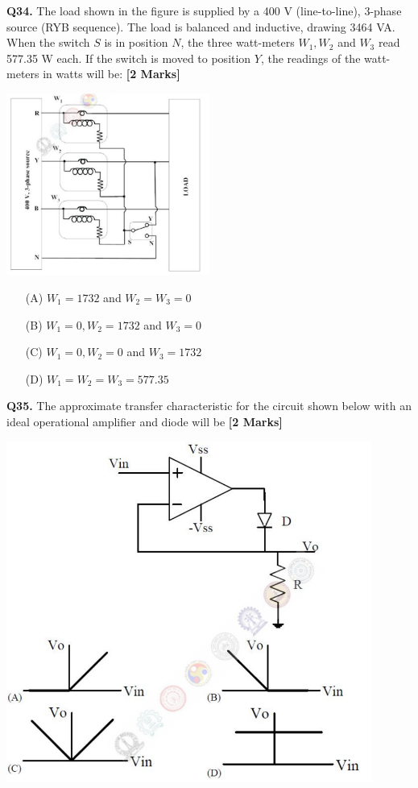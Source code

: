 \documentclass[11pt]{article}
\newcommand{\questionb}[2]{
    \noindent\textbf{Q#2.} #1 \hfill \textbf{[2 Marks]}
}
\begin{document}
\questionb{The load shown in the figure is supplied by a 400 V (line-to-line), 3-phase source (RYB sequence). The load is balanced and inductive, drawing 3464 VA. When the switch \( S \) is in position \( N \), the three watt-meters \( W_1, W_2 \) and \( W_3 \) read 577.35 W each. If the switch is moved to position \( Y \), the readings of the watt-meters in watts will be:}{34}
\begin{center}
\includegraphics[width=0.5\textwidth]{figures/34.png}
\end{center}
\begin{enumerate}
    \item[(A)] \( W_1 = 1732 \) and \( W_2 = W_3 = 0 \)  
    \item[(B)] \( W_1 = 0, W_2 = 1732 \) and \( W_3 = 0 \)  
    \item[(C)] \( W_1 = 0, W_2 = 0 \) and \( W_3 = 1732 \)  
    \item[(D)] \( W_1 = W_2 = W_3 = 577.35 \)  
\end{enumerate}
\vspace{0.5cm}

\questionb{The approximate transfer characteristic for the circuit shown below with an ideal operational amplifier and diode will be}{35}
\begin{center}
\includegraphics[width=0.9\textwidth]{figures/35.png}
\end{center}
\vspace{0.5cm}
\end{document}
